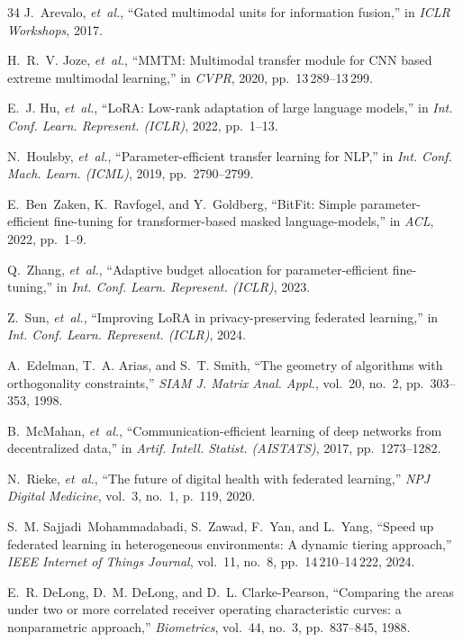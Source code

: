 \documentclass[journal,10pt,twocolumn]{IEEEtran}
\begin{document}
\begin{thebibliography}{34}
J.~Arevalo, \emph{et~al.}, ``Gated multimodal units for information fusion,'' in \emph{ICLR Workshops}, 2017.

H.~R.~V. Joze, \emph{et~al.}, ``MMTM: Multimodal transfer module for CNN based extreme multimodal learning,'' in \emph{CVPR}, 2020, pp.~13\,289--13\,299.

E.~J. Hu, \emph{et~al.}, ``LoRA: Low-rank adaptation of large language models,'' in \emph{Int. Conf. Learn. Represent. (ICLR)}, 2022, pp.~1--13.

N.~Houlsby, \emph{et~al.}, ``Parameter-efficient transfer learning for NLP,'' in \emph{Int. Conf. Mach. Learn. (ICML)}, 2019, pp.~2790--2799.

E.~Ben~Zaken, K.~Ravfogel, and Y.~Goldberg, ``BitFit: Simple parameter-efficient fine-tuning for transformer-based masked language-models,'' in \emph{ACL}, 2022, pp.~1--9.

Q.~Zhang, \emph{et~al.}, ``Adaptive budget allocation for parameter-efficient fine-tuning,'' in \emph{Int. Conf. Learn. Represent. (ICLR)}, 2023.

Z.~Sun, \emph{et~al.}, ``Improving LoRA in privacy-preserving federated learning,'' in \emph{Int. Conf. Learn. Represent. (ICLR)}, 2024.

A.~Edelman, T.~A. Arias, and S.~T. Smith, ``The geometry of algorithms with orthogonality constraints,'' \emph{SIAM J. Matrix Anal. Appl.}, vol.~20, no.~2, pp.~303--353, 1998.

B.~McMahan, \emph{et~al.}, ``Communication-efficient learning of deep networks from decentralized data,'' in \emph{Artif. Intell. Statist. (AISTATS)}, 2017, pp.~1273--1282.

N.~Rieke, \emph{et~al.}, ``The future of digital health with federated learning,'' \emph{NPJ Digital Medicine}, vol.~3, no.~1, p.~119, 2020.

S.~M. Sajjadi~Mohammadabadi, S.~Zawad, F.~Yan, and L.~Yang, ``Speed up federated learning in heterogeneous environments: A dynamic tiering approach,'' \emph{IEEE Internet of Things Journal}, vol.~11, no.~8, pp.~14\,210--14\,222, 2024.

E.~R. DeLong, D.~M. DeLong, and D.~L. Clarke-Pearson, ``Comparing the areas under two or more correlated receiver operating characteristic curves: a nonparametric approach,'' \emph{Biometrics}, vol.~44, no.~3, pp.~837--845, 1988.


\end{thebibliography}
\end{document}
